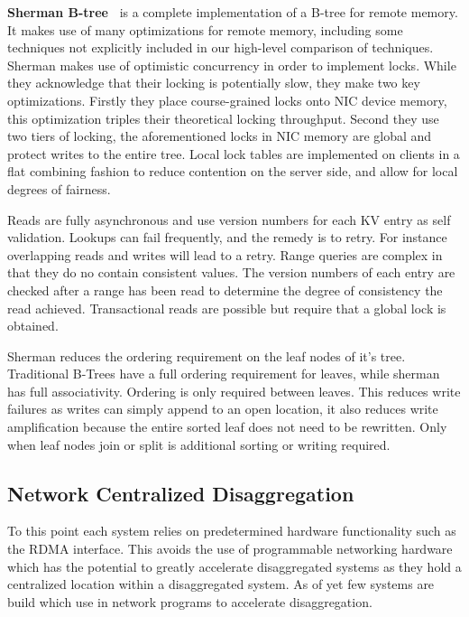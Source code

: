 

\textbf{Sherman B-tree~\cite{sherman}}
is a complete implementation of a B-tree for remote memory.  It makes use of
many optimizations for remote memory, including some techniques not explicitly
included in our high-level comparison of techniques. Sherman makes use of
optimistic concurrency in order to implement locks. While they acknowledge that
their locking is potentially slow, they make two key optimizations. Firstly they
place course-grained locks onto NIC device memory, this optimization triples
their theoretical locking throughput. Second they use two tiers of locking, the
aforementioned locks in NIC memory are global and protect writes to the entire
tree. Local lock tables are implemented on clients in a flat combining fashion
to reduce contention on the server side, and allow for local degrees of
fairness.

Reads are fully asynchronous and use version numbers for each KV entry as self
validation. Lookups can fail frequently, and the remedy is to retry.  For
instance overlapping reads and writes will lead to a retry. Range queries are
complex in that they do no contain consistent values. The version numbers of
each entry are checked after a range has been read to determine the degree of
consistency the read achieved. Transactional reads are possible but require that
a global lock is obtained.

Sherman reduces the ordering requirement on the leaf nodes of it's tree.
Traditional B-Trees have a full ordering requirement for leaves, while sherman
has full associativity. Ordering is only required between leaves. This reduces
write failures as writes can simply append to an open location, it also reduces
write amplification because the entire sorted leaf does not need to be
rewritten. Only when leaf nodes join or split is additional sorting or writing
required.



\subsection{Network Centralized Disaggregation}

To this point each system relies on predetermined hardware functionality such as
the RDMA interface. This avoids the use of programmable networking hardware
which has the potential to greatly accelerate disaggregated systems as they hold
a centralized location within a disaggregated system. As of yet few systems are
build which use in network programs to accelerate disaggregation.

